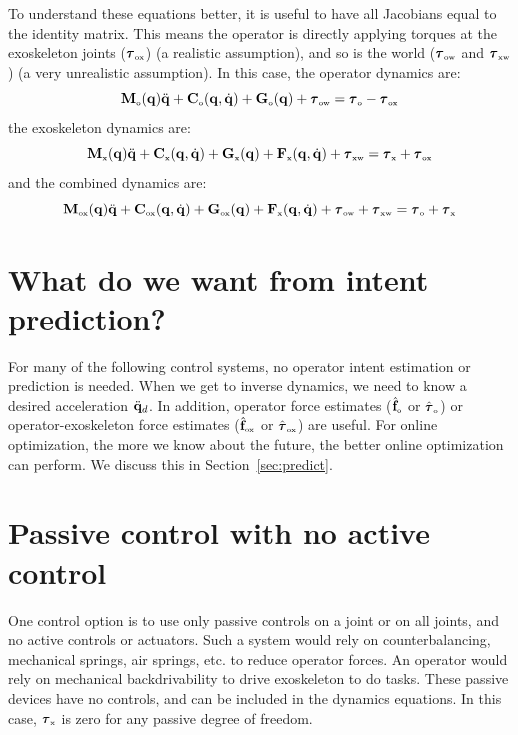 \documentclass[letterpaper,12pt,fullpage]{article}
\newcommand{\myo}{{\mbox {\tiny o}}}
\newcommand{\myx}{{\mbox {\tiny x}}}
\newcommand{\ox}{{\mbox {\tiny ox}}}
\newcommand{\ow}{{\mbox {\tiny ow}}}
\newcommand{\xw}{{\mbox {\tiny xw}}}
\begin{document}
To understand these equations better, it is useful to have all Jacobians equal
to the identity matrix. This means the operator is directly applying torques
at the exoskeleton joints ($\vtau_{\ox}$) (a realistic assumption), 
and so is the world ($\vtau_{\ow}$ and $\vtau_{\xw}$)
(a very unrealistic assumption). In this case,
the operator dynamics are:
\begin{equation}
\mM_{\myo}(\vq) \ddot{\vq} + \mC_{\myo}(\vq,\dot{\vq}) + \mG_{\myo}(\vq)
+ \vtau_{\ow} = \vtau_{\myo} - \vtau_{\ox}
\end{equation}
the exoskeleton dynamics are:
\begin{equation}
\mM_{\myx}(\vq) \ddot{\vq} + \mC_{\myx}(\vq,\dot{\vq}) + \mG_{\myx}(\vq)
+ \mF_{\myx}(\vq,\dot{\vq})
+ \vtau_{\xw} = \vtau_{\myx} + \vtau_{\ox}
\end{equation}
and the combined dynamics are:
\begin{equation}
\mM_{\ox}(\vq) \ddot{\vq} + \mC_{\ox}(\vq,\dot{\vq}) + \mG_{\ox}(\vq)
+ \mF_{\myx}(\vq,\dot{\vq})
+ \vtau_{\ow}
+ \vtau_{\xw} 
= \vtau_{\myo} + \vtau_{\myx}
\end{equation}

\section{What do we want from intent prediction?}

For many of the following control systems, no operator intent estimation or
prediction is needed.
When we get to inverse dynamics, we need to know a desired acceleration
$\ddot{{\bf q}}_d$.
In addition,
operator force 
estimates ($\hat{\vf}_{\myo}$ or $\hat{\vtau}_{\myo}$) or
operator-exoskeleton force 
estimates ($\hat{\vf}_{\ox}$ or $\hat{\vtau}_{\ox}$) are useful.
For online optimization, the more we know about the future, the better online
optimization can perform. We discuss this in Section~\ref{sec:predict}.

\section{Passive control with no active control}

One control option is to use only passive controls on a joint or on
all joints, and no active controls
or actuators.
Such a system would rely on counterbalancing, mechanical springs, air springs, etc.
to reduce operator forces. 
An operator would rely on mechanical backdrivability to drive
exoskeleton to do tasks.
These passive devices have no controls, and can be included in the dynamics equations.
In this case, 
$\vtau_{\myx}$ is zero for any passive degree of freedom.
\end{document}
